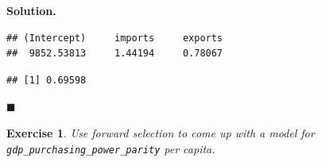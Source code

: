 \documentclass[10pt,b5paper,krantz1]{krantz}
\newenvironment{Shaded}{\begin{snugshade}}{\end{snugshade}}
\newcommand{\KeywordTok}[1]{\textcolor[rgb]{0.27,0.27,0.27}{\textbf{#1}}}
\newcommand{\NormalTok}[1]{#1}
\newcommand{\OperatorTok}[1]{\textcolor[rgb]{0.43,0.43,0.43}{\textbf{#1}}}
\newtheorem{exercise}{Exercise}[chapter]
\newenvironment{solution}{%
\bigskip\noindent\textbf{Solution. }%
\it\ignorespaces%
\ignorespaces%
}{\ignorespaces%
\hfill$\blacksquare$%
}
\begin{document}
\begin{solution}
\begin{verbatim}
## (Intercept)     imports     exports 
##  9852.53813     1.44194     0.78067
\end{verbatim}

\begin{Shaded}
\end{Shaded}

\begin{verbatim}
## [1] 0.69598
\end{verbatim}

\end{solution}

\begin{exercise}

Use forward selection to come up with
a model for \texttt{gdp\_purchasing\_power\_parity} per capita.

\end{exercise}
\end{document}
